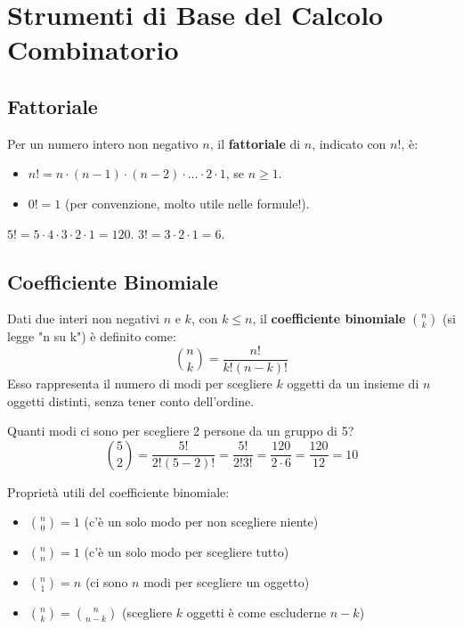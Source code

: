 \section{Strumenti di Base del Calcolo Combinatorio}

\subsection{Fattoriale}
\begin{definition}[Fattoriale]
Per un numero intero non negativo $n$, il \textbf{fattoriale} di $n$, indicato con $n!$, è:
\begin{itemize}
    \item $n! = n \cdot (n-1) \cdot (n-2) \cdot \dots \cdot 2 \cdot 1$, se $n \ge 1$.
    \item $0! = 1$ (per convenzione, molto utile nelle formule!).
\end{itemize}
\end{definition}
\begin{example}
$5! = 5 \cdot 4 \cdot 3 \cdot 2 \cdot 1 = 120$.
$3! = 3 \cdot 2 \cdot 1 = 6$.
\end{example}

\subsection{Coefficiente Binomiale}
\begin{definition}
Dati due interi non negativi $n$ e $k$, con $k \le n$, il \textbf{coefficiente binomiale} $\binom{n}{k}$ (si legge "n su k") è definito come:
$$ \binom{n}{k} = \frac{n!}{k!(n-k)!} $$
Esso rappresenta il numero di modi per scegliere $k$ oggetti da un insieme di $n$ oggetti distinti, senza tener conto dell'ordine.
\end{definition}

\begin{example}
Quanti modi ci sono per scegliere 2 persone da un gruppo di 5?
$$ \binom{5}{2} = \frac{5!}{2!(5-2)!} = \frac{5!}{2!3!} = \frac{120}{2 \cdot 6} = \frac{120}{12} = 10 $$
\end{example}

Proprietà utili del coefficiente binomiale:
\begin{itemize}
    \item $\binom{n}{0} = 1$ (c'è un solo modo per non scegliere niente)
    \item $\binom{n}{n} = 1$ (c'è un solo modo per scegliere tutto)
    \item $\binom{n}{1} = n$ (ci sono $n$ modi per scegliere un oggetto)
    \item $\binom{n}{k} = \binom{n}{n-k}$ (scegliere $k$ oggetti è come escluderne $n-k$)
\end{itemize}

